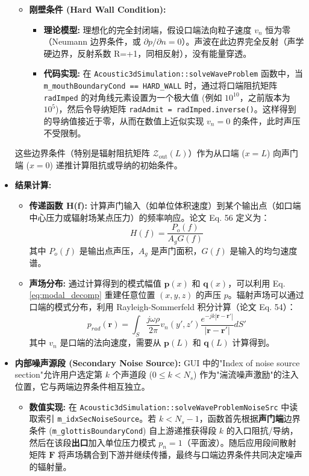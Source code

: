 \documentclass{ctexart}
\begin{document}
\begin{itemize}
\begin{itemize}
        \item \textbf{刚壁条件 (Hard Wall Condition):}
            \begin{itemize}
                \item \textbf{理论模型:} 理想化的完全封闭端，假设口端法向粒子速度 $v_n$ 恒为零（Neumann 边界条件，或 $\partial p / \partial n = 0$）。声波在此边界完全反射（声学硬边界，反射系数 R=+1，同相反射），没有能量穿透。
                \item \textbf{代码实现:} 在 \texttt{Acoustic3dSimulation::solveWaveProblem} 函数中，当 \texttt{m\_mouthBoundaryCond == HARD\_WALL} 时，通过将口端阻抗矩阵 \texttt{radImped} 的对角线元素设置为一个极大值 (例如 $10^{10}$，之前版本为 $10^5$)，然后令导纳矩阵 \texttt{radAdmit = radImped.inverse()}。这样得到的导纳值接近于零，从而在数值上近似实现 $v_n=0$ 的条件，此时声压不受限制。
            \end{itemize}
    \end{itemize}
    这些边界条件（特别是辐射阻抗矩阵 $\boldsymbol{\mathcal{Z}}_{\text{out}}(L)$）作为从口端 ($x=L$) 向声门端 ($x=0$) 递推计算阻抗或导纳的初始条件。
    \item \textbf{结果计算:}
        \begin{itemize}
            \item \textbf{传递函数 H(f):} 计算声门输入（如单位体积速度）到某个输出点（如口端中心压力或辐射场某点压力）的频率响应。论文 Eq. 56 定义为：
            \[ H(f) = \frac{P_o(f)}{A_g G(f)} \]
            其中 $P_o(f)$ 是输出点声压，$A_g$ 是声门面积，$G(f)$ 是输入的均匀速度谱。
            \item \textbf{声场分布:} 通过计算得到的模式幅值 $\mathbf{p}(x)$ 和 $\mathbf{q}(x)$，可以利用 Eq. \eqref{eq:modal_decomp} 重建任意位置 $(x,y,z)$ 的声压 $p$。辐射声场可以通过口端的模式分布，利用 Rayleigh-Sommerfeld 积分计算（论文 Eq. 54）：
            \[ p_{rad}(\mathbf{r}) = \int_S \frac{j\omega\rho}{2\pi} v_n(y', z') \frac{e^{-jk|\mathbf{r}-\mathbf{r}'|}}{|\mathbf{r}-\mathbf{r}'|} dS' \]
            其中 $v_n$ 是口端的法向速度，需要从 $\mathbf{p}(L)$ 和 $\mathbf{q}(L)$ 计算得到。
        \end{itemize}
    \item \textbf{内部噪声源段 (Secondary Noise Source):} GUI 中的"Index of noise source section"允许用户选定第 $k$ 个声道段 ($0\le k<N_s$) 作为"湍流噪声激励"的注入位置，它与两端边界条件相互独立。
        \begin{itemize}
            \item \textbf{数值实现:} 在 \texttt{Acoustic3dSimulation::solveWaveProblemNoiseSrc} 中读取索引 \texttt{m\_idxSecNoiseSource}。若 $k< N_s-1$，函数首先根据\textbf{声门端}边界条件 (\texttt{m\_glottisBoundaryCond}) 自上游递推获得段 $k$ 的入口阻抗/导纳，然后在该段\textbf{出口}加入单位压力模式 $p_n=1$（平面波）。随后应用段间散射矩阵 $\mathbf{F}$ 将声场耦合到下游并继续传播，最终与口端边界条件共同决定噪声的辐射量。

\end{itemize}
\end{itemize}
\end{document}

